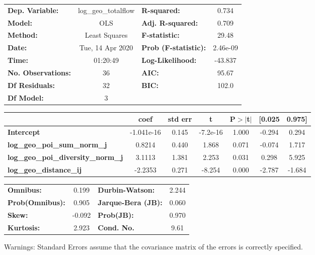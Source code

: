 \begin{center}
\begin{tabular}{lclc}
\toprule
\textbf{Dep. Variable:}                    & log\_geo\_totalflow & \textbf{  R-squared:         } &     0.734   \\
\textbf{Model:}                            &         OLS         & \textbf{  Adj. R-squared:    } &     0.709   \\
\textbf{Method:}                           &    Least Squares    & \textbf{  F-statistic:       } &     29.48   \\
\textbf{Date:}                             &   Tue, 14 Apr 2020  & \textbf{  Prob (F-statistic):} &  2.46e-09   \\
\textbf{Time:}                             &       01:20:49      & \textbf{  Log-Likelihood:    } &   -43.837   \\
\textbf{No. Observations:}                 &            36       & \textbf{  AIC:               } &     95.67   \\
\textbf{Df Residuals:}                     &            32       & \textbf{  BIC:               } &     102.0   \\
\textbf{Df Model:}                         &             3       & \textbf{                     } &             \\
\bottomrule
\end{tabular}
\begin{tabular}{lcccccc}
                                           & \textbf{coef} & \textbf{std err} & \textbf{t} & \textbf{P$> |$t$|$} & \textbf{[0.025} & \textbf{0.975]}  \\
\midrule
\textbf{Intercept}                         &   -1.041e-16  &        0.145     &  -7.2e-16  &         1.000        &       -0.294    &        0.294     \\
\textbf{log\_geo\_poi\_sum\_norm\_j}       &       0.8214  &        0.440     &     1.868  &         0.071        &       -0.074    &        1.717     \\
\textbf{log\_geo\_poi\_diversity\_norm\_j} &       3.1113  &        1.381     &     2.253  &         0.031        &        0.298    &        5.925     \\
\textbf{log\_geo\_distance\_ij}            &      -2.2353  &        0.271     &    -8.254  &         0.000        &       -2.787    &       -1.684     \\
\bottomrule
\end{tabular}
\begin{tabular}{lclc}
\textbf{Omnibus:}       &  0.199 & \textbf{  Durbin-Watson:     } &    2.244  \\
\textbf{Prob(Omnibus):} &  0.905 & \textbf{  Jarque-Bera (JB):  } &    0.060  \\
\textbf{Skew:}          & -0.092 & \textbf{  Prob(JB):          } &    0.970  \\
\textbf{Kurtosis:}      &  2.923 & \textbf{  Cond. No.          } &     9.61  \\
\bottomrule
\end{tabular}
\end{center}

Warnings: \newline
 [1] Standard Errors assume that the covariance matrix of the errors is correctly specified.